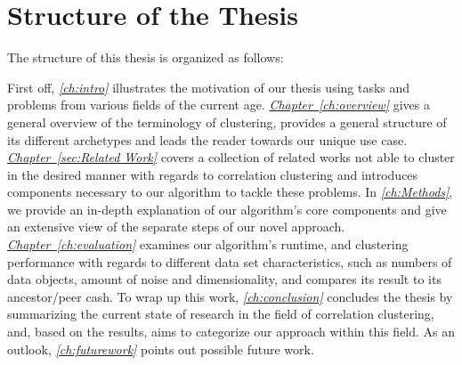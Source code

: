\section{Structure of the Thesis}
The structure of this thesis is organized as follows:

First off, \textit{\autoref{ch:intro}} illustrates the motivation of our thesis using tasks and problems from various fields of the current age.
\textit{\hyperref[ch:overview]{Chapter~\ref*{ch:overview}}} gives a general overview of the terminology of clustering, provides a general structure of its different archetypes and leads the reader towards our unique use case.
\textit{\hyperref[sec:Related Work]{Chapter~\ref*{sec:Related Work}}} covers a collection of related works not able to cluster in the desired manner with regards to correlation clustering and introduces components necessary to our algorithm to tackle these problems.
In \textit{\autoref{ch:Methods}}, we provide an in-depth explanation of our algorithm's core components and give an extensive view of the separate steps of our novel approach.
\textit{\hyperref[ch:evaluation]{Chapter~\ref*{ch:evaluation}}} examines our algorithm's runtime, and clustering performance with regards to different data set characteristics, such as numbers of data objects, amount of noise and dimensionality, and compares its result to its ancestor/peer \acrshort{cash}.
To wrap up this work, \textit{\autoref{ch:conclusion}} concludes the thesis by summarizing the current state of research in the field of correlation clustering, and, based on the results, aims to categorize our approach within this field. As an outlook, \textit{\autoref{ch:futurework}} points out possible future work.


